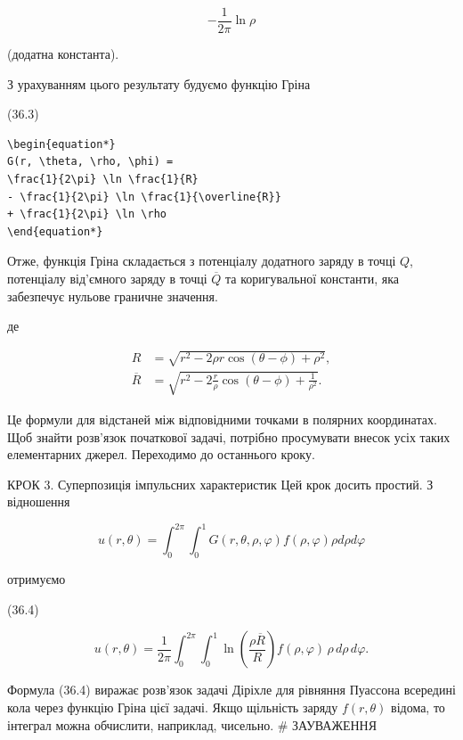 \documentclass[
  ukrainian,
]{article}
\begin{document}
\begin{equation*}
-\frac{1}{2\pi}\ln\rho
\end{equation*}

(додатна константа).

З урахуванням цього результату будуємо функцію Гріна

(36.3)

\begin{verbatim}
\begin{equation*}
G(r, \theta, \rho, \phi) =
\frac{1}{2\pi} \ln \frac{1}{R}
- \frac{1}{2\pi} \ln \frac{1}{\overline{R}}
+ \frac{1}{2\pi} \ln \rho
\end{equation*}
\end{verbatim}

Отже, функція Гріна складається з потенціалу додатного заряду в точці
\(Q\), потенціалу від'ємного заряду в точці \(\overline{Q}\) та
коригувальної константи, яка забезпечує нульове граничне значення.

де

\begin{equation*}
\begin{aligned}
R &= \sqrt{r^2 - 2\rho r \cos(\theta - \phi) + \rho^2},\\
\overline{R} &= \sqrt{r^2 - 2\frac{r}{\rho}\cos(\theta - \phi) + \frac{1}{\rho^2}}.
\end{aligned}
\end{equation*}

Це формули для відстаней між відповідними точками в полярних
координатах. Щоб знайти розв'язок початкової задачі, потрібно
просумувати внесок усіх таких елементарних джерел. Переходимо до
останнього кроку.

КРОК 3. Суперпозиція імпульсних характеристик Цей крок досить простий. З
відношення

\begin{equation*}
u(r, \theta) = \int_{0}^{2\pi} \int_{0}^{1} G(r, \theta, \rho, \varphi) f(\rho, \varphi) \rho d\rho d\varphi
\end{equation*}

отримуємо

(36.4)

\begin{equation*}
u(r, \theta) = \frac{1}{2\pi} \int_{0}^{2\pi} \int_{0}^{1}
\ln \left(\frac{\rho \overline{R}}{R}\right) f(\rho, \varphi)\,\rho\, d\rho\, d\varphi.
\end{equation*}

Формула (36.4) виражає розв'язок задачі Діріхле для рівняння Пуассона
всередині кола через функцію Гріна цієї задачі. Якщо щільність заряду
\(f(r, \theta)\) відома, то інтеграл можна обчислити, наприклад,
чисельно. \# ЗАУВАЖЕННЯ
\end{document}
